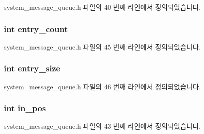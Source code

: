 system\+\_\+message\+\_\+queue.\+h 파일의 40 번째 라인에서 정의되었습니다.

\subsubsection[{\texorpdfstring{entry\+\_\+count}{entry_count}}]{\setlength{\rightskip}{0pt plus 5cm}int entry\+\_\+count\hspace{0.3cm}{\ttfamily [private]}}\hypertarget{classsystem__message__queue_af4144b5c7df947d23550c7c0b8b6afff}{}\label{classsystem__message__queue_af4144b5c7df947d23550c7c0b8b6afff}


system\+\_\+message\+\_\+queue.\+h 파일의 45 번째 라인에서 정의되었습니다.

\subsubsection[{\texorpdfstring{entry\+\_\+size}{entry_size}}]{\setlength{\rightskip}{0pt plus 5cm}int entry\+\_\+size\hspace{0.3cm}{\ttfamily [private]}}\hypertarget{classsystem__message__queue_a85b70ab9a21d34366075fd47dc59f555}{}\label{classsystem__message__queue_a85b70ab9a21d34366075fd47dc59f555}


system\+\_\+message\+\_\+queue.\+h 파일의 46 번째 라인에서 정의되었습니다.

\subsubsection[{\texorpdfstring{in\+\_\+pos}{in_pos}}]{\setlength{\rightskip}{0pt plus 5cm}int in\+\_\+pos\hspace{0.3cm}{\ttfamily [private]}}\hypertarget{classsystem__message__queue_a8a3e7803079f633c16e621bbdbbbdaf5}{}\label{classsystem__message__queue_a8a3e7803079f633c16e621bbdbbbdaf5}


system\+\_\+message\+\_\+queue.\+h 파일의 43 번째 라인에서 정의되었습니다.

